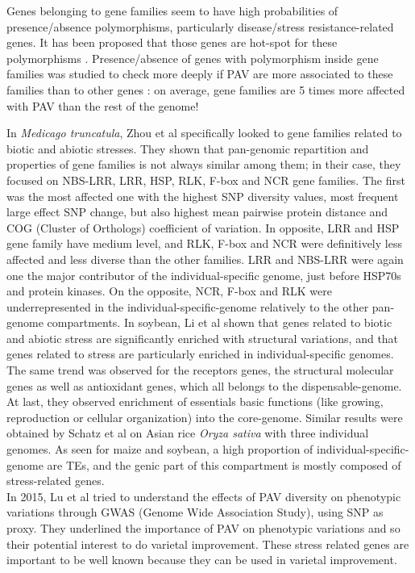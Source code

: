 \documentclass[a4paper,10pt,twoside]{report}
\begin{document}
Genes belonging to gene families seem to have high probabilities of presence/absence polymorphisms, particularly disease/stress resistance-related genes. It has been proposed that those genes are hot-spot for these polymorphisms \cite{Gonzalez2013}. Presence/absence of genes with polymorphism inside gene families was studied to check more deeply if PAV are more associated to these families than to other genes \cite{Gonzalez2013}: on average, gene families are 5 times more affected with PAV than the rest of the genome!

In \textit{Medicago truncatula},  Zhou et al \cite{Zhou2017} specifically looked to gene families related to biotic and abiotic stresses. They shown that pan-genomic repartition and properties of gene families is not always similar among them; in their case,  they focused on NBS-LRR, LRR, HSP, RLK, F-box and NCR gene families. The first was the most affected one with the highest SNP diversity values, most frequent large effect SNP change, but also highest mean pairwise protein distance and COG (Cluster of Orthologs) coefficient of variation. In opposite, LRR and HSP gene family have medium level, and RLK, F-box and NCR were definitively less affected and less diverse than the other families. LRR  and  NBS-LRR were again one  the major contributor of the individual-specific genome, just before HSP70s and protein kinases. On the opposite, NCR, F-box and RLK were underrepresented in the individual-specific-genome relatively to the other pan-genome compartments. In soybean, Li et al \cite{Li2014b} shown that genes related to biotic and abiotic stress are significantly enriched with structural variations, and that genes related to stress are particularly enriched in individual-specific genomes. The same trend was observed for the receptors genes, the structural molecular genes as well as antioxidant genes, which all belongs to the dispensable-genome. At last, they observed enrichment of essentials basic functions (like growing, reproduction or cellular organization) into the core-genome. Similar results were obtained by Schatz et al \cite{Schatz2014} on Asian rice \emph{Oryza sativa} with three individual genomes. As seen for maize and soybean, a high proportion of individual-specific-genome are TEs, and the genic part of this compartment is mostly composed of stress-related genes.\\

In 2015, Lu et al \cite{Lu2015} tried to understand the effects of PAV diversity on phenotypic variations through GWAS (Genome Wide Association Study), using SNP as proxy. They underlined the importance of PAV on phenotypic variations and so their potential interest to do varietal improvement. These stress related genes are important to be well known because they can be used in varietal improvement.
\end{document}
